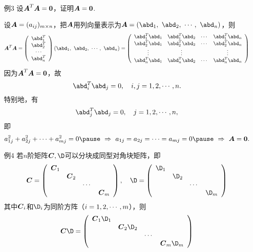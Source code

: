 \begin{frame}
  \begin{footnotesize}
    \begin{exampleblock}{例3}
      设$\boldsymbol{A}^T\boldsymbol{A}=\boldsymbol{0}$，证明$\boldsymbol{A}=\boldsymbol{0}$.
    \end{exampleblock}
    \pause
    \proofname
    设$\boldsymbol{A}=(a_{ij})_{m\times n}$，把$\boldsymbol{A}$用列向量表示为$\A=(\abd_1, ~\abd_2,~\cd,~\abd_n)$，则
    $$
    \A^T\A = \left(
    \begin{array}{c}
      \abd_1^T\\
      \abd_2^T\\
      \cd \\
      \abd_n^T
    \end{array}
    \right) (\abd_1, ~\abd_2,~\cd,~\abd_n) = \left(
    \begin{array}{cccc}
      \abd_1^T\abd_1 & \abd_1^T\abd_2 & \cd & \abd_1^T\abd_n\\
      \abd_2^T\abd_1 & \abd_2^T\abd_2 & \cd & \abd_2^T\abd_n\\
      \vd & \vd & & \vd \\
      \abd_n^T\abd_1 & \abd_n^T\abd_2 & \cd & \abd_n^T\abd_n
    \end{array}
    \right)
    $$
    \pause 
    因为$\boldsymbol{A}^T\boldsymbol{A}=\boldsymbol{0}$，故
    $$
    \abd_i^T \abd_j = 0, \quad i,j=1,2,\cd,n.
    $$
    \pause
    特别地，有
    $$
    \abd_j^T \abd_j = 0, \quad j=1,2,\cd,n,
    $$\pause
    即
    $$
    a_{1j}^2+a_{2j}^2+\cd+a_{mj}^2=0 \pause ~\Rightarrow~ a_{1j}=a_{2j}=\cd=a_{mj}=0 \pause~\Rightarrow~ \A = \zero.
    $$
  \end{footnotesize}
\end{frame}

\begin{frame}
  \begin{footnotesize}
  \begin{exampleblock}{例4}
    若$n$阶矩阵$\C,\D$可以分块成同型对角块矩阵，即
    $$
    \C = \left(
    \begin{array}{cccc}
      \C_1&&&\\
      &\C_2&&\\
      &&\cd&\\
      &&&\C_m
    \end{array}
    \right),\quad
    \D = \left(
    \begin{array}{cccc}
      \D_1&&&\\
      &\D_2&&\\
      &&\cd&\\
      &&&\D_m
    \end{array}
    \right)
    $$
    其中$\boldsymbol{C}_i$和$\D_i$为同阶方阵（$i=1,2,\cdots,m$），则
    $$
    \C\D = \left(
    \begin{array}{cccc}
      \C_1\D_1&&&\\
      &\C_2\D_2&&\\
      &&\cd&\\
      &&&\C_m\D_m
    \end{array}
    \right)
    $$
  \end{exampleblock}
    
  \end{footnotesize}
\end{frame}


